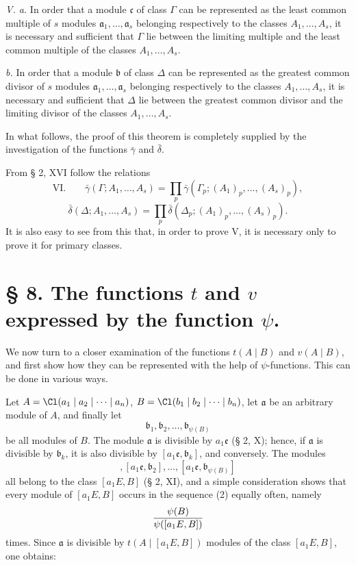 \emph{V. a.} In order that a module $\mathfrak c$ of class $\Gamma$ can be represented as the least common multiple of $s$ modules $\mathfrak a_1,\ldots,\mathfrak a_s$ belonging respectively to the classes $A_1,\ldots,A_s$, it is necessary and sufficient that $\Gamma$ lie between the limiting multiple and the least common multiple of the classes $A_1,\ldots,A_s$.

\emph{b.} In order that a module $\mathfrak b$ of class $\Delta$ can be represented as the greatest common divisor of $s$ modules $\mathfrak a_1,\ldots,\mathfrak a_s$ belonging respectively to the classes $A_1,\ldots,A_s$, it is necessary and sufficient that $\Delta$ lie between the greatest common divisor and the limiting divisor of the classes $A_1,\ldots,A_s$.

In what follows, the proof of this theorem is completely supplied by the investigation of the functions $\bar\gamma$ and $\bar\delta$.

From § 2, XVI follow the relations
\[
\text{VI.}\qquad
 \bar\gamma(\Gamma;A_1,\ldots,A_s)
 =\prod_p \bar\gamma(\Gamma_p;(A_1)_p,\ldots,(A_s)_p),
\]
\[
 \bar\delta(\Delta;A_1,\ldots,A_s)
 =\prod_p \bar\delta(\Delta_p;(A_1)_p,\ldots,(A_s)_p).
\]
It is also easy to see from this that, in order to prove V, it is necessary only to prove it for primary classes.

\section*{§ 8. The functions $t$ and $v$ expressed by the function $\psi$.}

We now turn to a closer examination of the functions $t(A\mid B)$ and $v(A\mid B)$, and first show how they can be represented with the help of $\psi$-functions. This can be done in various ways.

Let $A=\Cl(a_1\mid a_2\mid\cdots\mid a_n)$, $B=\Cl(b_1\mid b_2\mid\cdots\mid b_n)$, let $\mathfrak a$ be an arbitrary module of $A$, and finally let
\begin{equation}
 \mathfrak b_1,\mathfrak b_2,\ldots,\mathfrak b_{\psi(B)}
\tag{1}
\end{equation}
be all modules of $B$. The module $\mathfrak a$ is divisible by $a_1\mathfrak e$ (§ 2, X); hence, if $\mathfrak a$ is divisible by $\mathfrak b_k$, it is also divisible by $[a_1\mathfrak e,\mathfrak b_k]$, and conversely. The modules
\begin{equation}
 [a_1\mathfrak e,\mathfrak b_1],
 [a_1\mathfrak e,\mathfrak b_2],\ldots,
 [a_1\mathfrak e,\mathfrak b_{\psi(B)}]
\tag{2}
\end{equation}
all belong to the class $[a_1E,B]$ (§ 2, XI), and a simple consideration shows that every module of $[a_1E,B]$ occurs in the sequence (2) equally often, namely
\[
 {\psi(B)\over\psi([a_1E,B])}
\]
times. Since $\mathfrak a$ is divisible by $t(A\mid [a_1E,B])$ modules of the class $[a_1E,B]$, one obtains:

